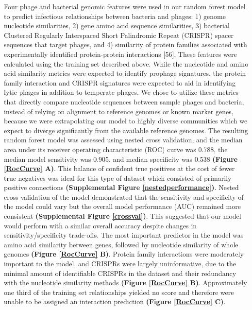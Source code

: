 \documentclass[12pt,]{article}
\begin{document}
Four phage and bacterial genomic features were used in our random forest
model to predict infectious relationships between bacteria and phages:
1) genome nucleotide similarities, 2) gene amino acid sequence
similarities, 3) bacterial Clustered Regularly Interspaced Short
Palindromic Repeat (CRISPR) spacer sequences that target phages, and 4)
similarity of protein families associated with experimentally identified
protein-protein interactions {[}56{]}. These features were calculated
using the training set described above. While the nucleotide and amino
acid similarity metrics were expected to identify prophage signatures,
the protein family interaction and CRISPR signatures were expected to
aid in identifying lytic phages in addition to temperate phages. We
chose to utilize these metrics that directly compare nucleotide
sequences between sample phages and bacteria, instead of relying on
alignment to reference genomes or known marker genes, because we were
extrapolating our model to highly diverse communities which we expect to
diverge significantly from the available reference genomes. The
resulting random forest model was assessed using nested cross
validation, and the median area under its receiver operating
characteristic (ROC) curve was 0.788, the median model sensitivity was
0.905, and median specificity was 0.538 \textbf{(Figure \ref{RocCurve}
A)}. This balance of confident true positives at the cost of fewer true
negatives was ideal for this type of dataset which consisted of
primarily positive connections \textbf{(Supplemental Figure
\ref{nestedperformance})}. Nested cross validation of the model
demonstrated that the sensitivity and specificity of the model could
vary but the overall model performance (AUC) remained more consistent
\textbf{(Supplemental Figure \ref{crossval})}. This suggested that our
model would perform with a similar overall accuracy despite changes in
sensitivity/specificity trade-offs. The most important predictor in the
model was amino acid similarity between genes, followed by nucleotide
similarity of whole genomes \textbf{(Figure \ref{RocCurve} B)}. Protein
family interactions were moderately important to the model, and CRISPRs
were largely uninformative, due to the minimal amount of identifiable
CRISPRs in the dataset and their redundancy with the nucleotide
similarity methods \textbf{(Figure \ref{RocCurve} B)}. Approximately one
third of the training set relationships yielded no score and therefore
were unable to be assigned an interaction prediction \textbf{(Figure
\ref{RocCurve} C)}.
\end{document}
